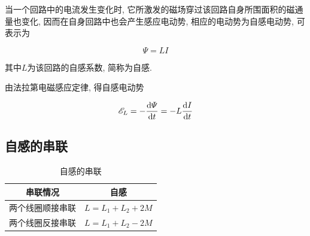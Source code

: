 当一个回路中的电流发生变化时, 它所激发的磁场穿过该回路自身所围面积的磁通量也变化, 因而在自身回路中也会产生感应电动势, 相应的电动势为自感电动势, 可表示为

\begin{equation}
	\varPsi = LI \label{C9-eq16}
\end{equation}

其中$L$为该回路的自感系数, 简称为自感. 

由法拉第电磁感应定律, 得自感电动势

\begin{equation}
	\mathscr{E}_L = -\dv{\varPsi}{t} = -L \dv{I}{t} \label{C9-eq17}
\end{equation}

\subsection{自感的串联}

\begin{table}[H]
	\centering
	\caption{自感的串联}
	\begin{tabular}{cc}
		\toprule[1pt]
		串联情况 & 自感 \\
		\hline
		两个线圈顺接串联 & $L = L_1 + L_2 + 2M$ \\
		两个线圈反接串联 & $L = L_1 + L_2 - 2M$ \\
		\bottomrule[1pt]
	\end{tabular}
\end{table}

